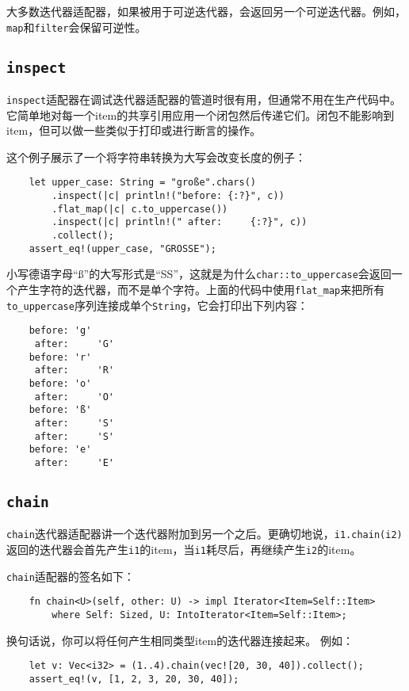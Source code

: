 大多数迭代器适配器，如果被用于可逆迭代器，会返回另一个可逆迭代器。例如，\texttt{map}和\texttt{filter}会保留可逆性。

\subsection{\texttt{inspect}}
\texttt{inspect}适配器在调试迭代器适配器的管道时很有用，但通常不用在生产代码中。它简单地对每一个item的共享引用应用一个闭包然后传递它们。闭包不能影响到item，但可以做一些类似于打印或进行断言的操作。

这个例子展示了一个将字符串转换为大写会改变长度的例子：
\begin{verbatim}
    let upper_case: String = "große".chars()
        .inspect(|c| println!("before: {:?}", c))
        .flat_map(|c| c.to_uppercase())
        .inspect(|c| println!(" after:     {:?}", c))
        .collect();
    assert_eq!(upper_case, "GROSSE");
\end{verbatim}

小写德语字母“ß”的大写形式是“SS”，这就是为什么\texttt{char::to\_uppercase}会返回一个产生字符的迭代器，而不是单个字符。上面的代码中使用\texttt{flat\_map}来把所有\texttt{to\_uppercase}序列连接成单个\texttt{String}，它会打印出下列内容：
\begin{verbatim}
    before: 'g'
     after:     'G'
    before: 'r'
     after:     'R'
    before: 'o'
     after:     'O'
    before: 'ß'
     after:     'S'
     after:     'S'
    before: 'e'
     after:     'E'
\end{verbatim}

\subsection{\texttt{chain}}
\texttt{chain}迭代器适配器讲一个迭代器附加到另一个之后。更确切地说，\texttt{i1.chain(i2)}返回的迭代器会首先产生\texttt{i1}的item，当\texttt{i1}耗尽后，再继续产生\texttt{i2}的item。

\texttt{chain}适配器的签名如下：
\begin{verbatim}
    fn chain<U>(self, other: U) -> impl Iterator<Item=Self::Item>
        where Self: Sized, U: IntoIterator<Item=Self::Item>;
\end{verbatim}

换句话说，你可以将任何产生相同类型item的迭代器连接起来。
例如：
\begin{verbatim}
    let v: Vec<i32> = (1..4).chain(vec![20, 30, 40]).collect();
    assert_eq!(v, [1, 2, 3, 20, 30, 40]);
\end{verbatim}

